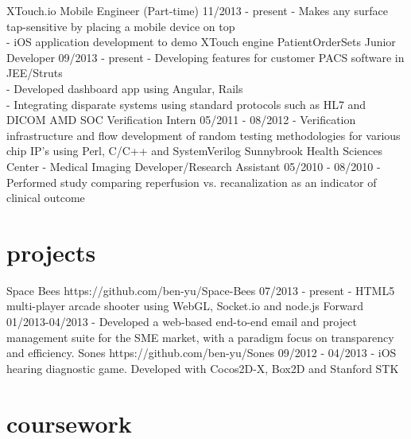 \documentclass[]{friggeri-cv}
\begin{document}
\begin{entrylist}
  \entry
    {XTouch.io}
    {Mobile Engineer (Part-time)}
    {11/2013 - present}
    {- Makes any surface tap-sensitive by placing a mobile device on top\\
     - iOS application development to demo XTouch engine}
  \entry
    {PatientOrderSets}
    {Junior Developer}
    {09/2013 - present}
    {- Developing features for customer PACS software in JEE/Struts\\
     - Developed dashboard app using Angular, Rails\\
     - Integrating disparate systems using standard protocols such as HL7 and DICOM}
  \entry
    {AMD}
    {SOC Verification Intern}
    {05/2011 - 08/2012}
    {- Verification infrastructure and  flow development of random testing methodologies for various chip   IP’s using Perl, C/C++ and SystemVerilog}
  \entry
    {Sunnybrook Health Sciences Center - Medical Imaging}
    {Developer/Research Assistant}
    {05/2010 - 08/2010}
    {- Performed study comparing reperfusion vs. recanalization as an indicator of clinical outcome}
\end{entrylist}

\section{projects}

\begin{entrylist}
  \entry
    {Space Bees}
    {https://github.com/ben-yu/Space-Bees}
    {07/2013 - present}
    {- HTML5 multi-player arcade shooter using WebGL, Socket.io and node.js}
  \entry
    {Forward}
    {}
    {01/2013-04/2013}
    {- Developed a web-based end-to-end email and project management suite for the SME market, with a paradigm focus on transparency and efficiency.}
  \entry
    {Sones}
    {https://github.com/ben-yu/Sones}
    {09/2012 - 04/2013}
    {- iOS hearing diagnostic game. Developed with Cocos2D-X, Box2D and Stanford STK}
\end{entrylist}

\newpage

\section{coursework}
\end{document}

